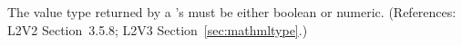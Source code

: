 The value type returned by a \FunctionDefinition's  must be
either boolean or numeric.  (References: L2V2 Section~3.5.8;
L2V3 Section~\ref{sec:mathmltype}.)

